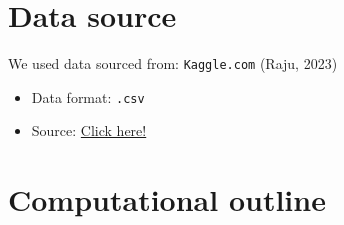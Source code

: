 \documentclass{article}
\begin{document}
\section{Data source}

We used data sourced from: \texttt{Kaggle.com} (Raju, 2023)
\begin{itemize}
    \item Data format: \texttt{.csv}
    \item Source: \href{https://www.kaggle.com/datasets/rajugc/laptop-selection-dataset?resource=download}{Click here!}  %
\end{itemize}

\section{Computational outline}
\end{document}
